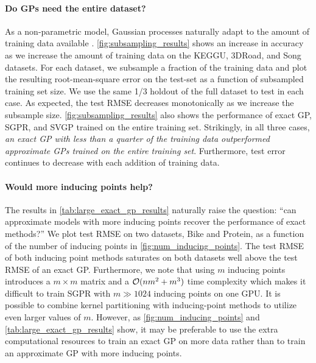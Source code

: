 \paragraph{Do GPs need the entire dataset?}
As a non-parametric model, Gaussian processes naturally adapt to the amount of training
data available \citep{wilsongpatt}. \autoref{fig:subsampling_results} shows an increase in accuracy as we increase the amount
of training data on the KEGGU, 3DRoad, and Song datasets. For each dataset, we
subsample a fraction of the training data and plot the resulting root-mean-square
error on the test-set as a function of subsampled training set size. We use the
same 1/3 holdout of the full dataset to test in each case.
As expected, the test RMSE decreases monotonically as we increase the subsample size.
\autoref{fig:subsampling_results} also shows the
performance of exact GP, SGPR, and SVGP trained on the entire training set.
Strikingly, in all three cases, \textit{an exact GP with less than a quarter of
the training data outperformed approximate GPs trained on the entire
training set}. Furthermore, test error continues to decrease with each addition of training data.

\paragraph{Would more inducing points help?}
The results in \cref{tab:large_exact_gp_results} naturally raise the question: ``can approximate models with more inducing
points recover the performance of exact methods?''
We plot test RMSE on two datasets, Bike and Protein, as a function of the number of inducing points in \autoref{fig:num_inducing_points}.
The test RMSE of both inducing point methods saturates on both datasets well above
the test RMSE of an exact GP.
Furthermore, we note that using $m$ inducing points introduces a $m \times m$
matrix and a $\bigo{nm^2 + m^3}$ time complexity
\cite{hensman2013gaussian,hensman2015scalable} which makes it
difficult to train SGPR with $m \gg 1024$ inducing points on
one GPU. It is possible to combine kernel partitioning with inducing-point methods to utilize even larger values of $m$.
However, as \autoref{fig:num_inducing_points} and \autoref{tab:large_exact_gp_results} show, it may be preferable
to use the extra computational resources to train an exact GP on more data rather than
to train an approximate GP with more inducing points.
%
